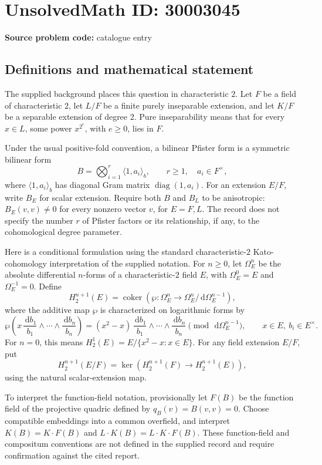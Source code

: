 \documentclass[11pt]{article}
\newcommand{\dd}{\,\mathrm{d}}
\begin{document}
\section*{UnsolvedMath ID: 30003045}
\textbf{Source problem code:} catalogue entry
\subsection{Definitions and mathematical statement}
The supplied background places this question in characteristic \(2\). Let \(F\) be a field of characteristic \(2\), let \(L/F\) be a finite purely inseparable extension, and let \(K/F\) be a separable extension of degree \(2\). Pure inseparability means that for every \(x\in L\), some power \(x^{2^e}\), with \(e\geq 0\), lies in \(F\).

Under the usual positive-fold convention, a bilinear Pfister form is a symmetric bilinear form
\[
 B=\bigotimes_{i=1}^{r}\langle 1,a_i\rangle_b,
 \qquad r\geq 1,\quad a_i\in F^\times,
\]
where \(\langle 1,a_i\rangle_b\) has diagonal Gram matrix \(\operatorname{diag}(1,a_i)\). For an extension \(E/F\), write \(B_E\) for scalar extension. Require both \(B\) and \(B_L\) to be anisotropic: \(B_E(v,v)\neq 0\) for every nonzero vector \(v\), for \(E=F,L\). The record does not specify the number \(r\) of Pfister factors or its relationship, if any, to the cohomological degree parameter.

Here is a conditional formulation using the standard characteristic-\(2\) Kato-cohomology interpretation of the supplied notation. For \(n\geq 0\), let \(\Omega_E^n\) be the absolute differential \(n\)-forms of a characteristic-\(2\) field \(E\), with \(\Omega_E^0=E\) and \(\Omega_E^{-1}=0\). Define
\[
 H_2^{n+1}(E)=\operatorname{coker}\!\left(
 \wp:\Omega_E^n\longrightarrow
 \Omega_E^n/\dd\Omega_E^{n-1}\right),
\]
where the additive map \(\wp\) is characterized on logarithmic forms by
\[
 \wp\!\left(x\,\frac{\dd b_1}{b_1}\wedge\cdots\wedge\frac{\dd b_n}{b_n}\right)
 = (x^2-x)\,\frac{\dd b_1}{b_1}\wedge\cdots\wedge\frac{\dd b_n}{b_n}
 \pmod{\dd\Omega_E^{n-1}},
 \qquad x\in E,\ b_i\in E^\times.
\]
For \(n=0\), this means \(H_2^1(E)=E/\{x^2-x:x\in E\}\). For any field extension \(E/F\), put
\[
 H_2^{n+1}(E/F)=\ker\!\left(H_2^{n+1}(F)\longrightarrow H_2^{n+1}(E)\right),
\]
using the natural scalar-extension map.

To interpret the function-field notation, provisionally let \(F(B)\) be the function field of the projective quadric defined by \(q_B(v)=B(v,v)=0\). Choose compatible embeddings into a common overfield, and interpret \(K(B)=K\mathbin{\cdot}F(B)\) and \(L\mathbin{\cdot}K(B)=L\mathbin{\cdot}K\mathbin{\cdot}F(B)\). These function-field and compositum conventions are not defined in the supplied record and require confirmation against the cited report.
\end{document}
